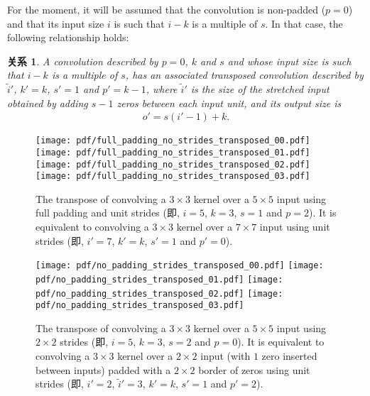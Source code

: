 \documentclass[notitlepage]{ctexrep}
\newtheorem{relationship}{关系}
\begin{document}
For the moment, it will be assumed that the convolution is non-padded ($p = 0$)
and that its input size $i$ is such that $i - k$ is a multiple of $s$. In that
case, the following relationship holds:

\begin{relationship}\label{rel:no_padding_strides_transposed}
A convolution described by $p = 0$, $k$ and $s$ and whose input
size is such that $i - k$ is a multiple of $s$, has an associated transposed
convolution described by $\tilde{i}'$, $k' = k$, $s' = 1$ and $p' = k - 1$,
where $\tilde{i}'$ is the size of the stretched input obtained by adding
$s - 1$ zeros between each input unit, and its output size is
\begin{equation*}
\begin{split}
    o' = s (i' - 1) + k.
\end{split}
\end{equation*}
\end{relationship}

\begin{figure}[p]
    \centering
    \texttt{[image: pdf/full\_padding\_no\_strides\_transposed\_00.pdf]}
    \texttt{[image: pdf/full\_padding\_no\_strides\_transposed\_01.pdf]}
    \texttt{[image: pdf/full\_padding\_no\_strides\_transposed\_02.pdf]}
    \texttt{[image: pdf/full\_padding\_no\_strides\_transposed\_03.pdf]}
    \caption{\label{fig:full_padding_no_strides_transposed} The transpose of
        convolving a $3 \times 3$ kernel over a $5 \times 5$ input using full
        padding and unit strides (即, $i = 5$, $k = 3$, $s = 1$ and $p = 2$).
        It is equivalent to convolving a $3 \times 3$ kernel over a $7 \times 7$
        input using unit strides (即, $i' = 7$, $k' = k$, $s' = 1$ and $p' =
        0$).}
\end{figure}

\begin{figure}[p]
    \centering
    \texttt{[image: pdf/no\_padding\_strides\_transposed\_00.pdf]}
    \texttt{[image: pdf/no\_padding\_strides\_transposed\_01.pdf]}
    \texttt{[image: pdf/no\_padding\_strides\_transposed\_02.pdf]}
    \texttt{[image: pdf/no\_padding\_strides\_transposed\_03.pdf]}
    \caption{\label{fig:no_padding_strides_transposed} The transpose of
        convolving a $3 \times 3$ kernel over a $5 \times 5$ input using $2
        \times 2$ strides (即, $i = 5$, $k = 3$, $s = 2$ and $p = 0$). It is
        equivalent to convolving a $3 \times 3$ kernel over a $2 \times 2$ input
        (with $1$ zero inserted between inputs) padded with a $2 \times 2$
        border of zeros using unit strides (即, $i' = 2$, $\tilde{i}' = 3$, $k'
        = k$, $s' = 1$ and $p' = 2$).}
\end{figure}
\end{document}

